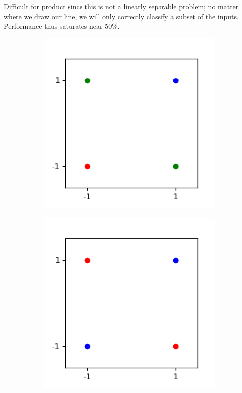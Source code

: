 \documentclass{article}
\begin{document}
Difficult for product since this is not a linearly separable problem; no matter where we draw our line, we will only correctly classify a subset of the inputs. Performance thus saturates near 50\%.

\begin{figure}[h]
	\centering
	\begin{subfigure}[t]{0.32\linewidth}
		\centering
		\includegraphics[width = 1.0\linewidth, trim={0 0 0 0}, clip=true]{figures/sum_2d.png}
	\end{subfigure}%
	\hspace{0.01 \linewidth}
	\begin{subfigure}[t]{0.32\linewidth}
		\centering
		\includegraphics[width = 1.0\linewidth, trim={0 0 0 0}, clip=true]{figures/prod_2d.png}

\end{subfigure}
\end{figure}
\end{document}
